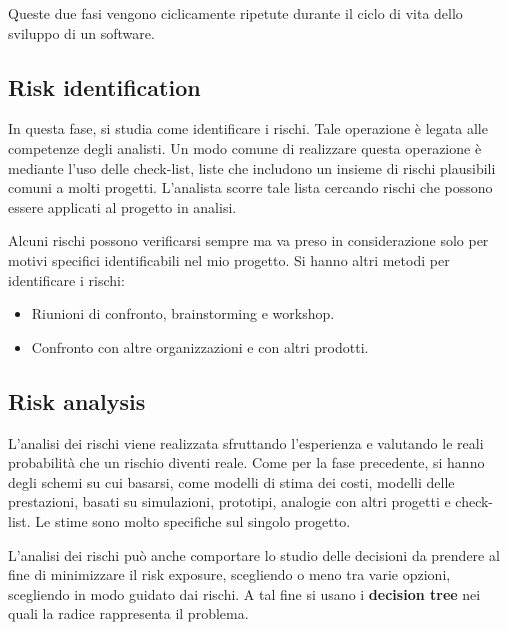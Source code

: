 Queste due fasi vengono ciclicamente ripetute durante il ciclo di vita dello
sviluppo di un software.
\subsection{Risk identification}
In questa fase, si studia come identificare i rischi. Tale operazione è legata
alle competenze degli analisti. Un modo comune di realizzare questa operazione è
mediante l'uso delle check-list, liste che includono un insieme di rischi plausibili
comuni a molti progetti. L'analista scorre tale lista cercando rischi che possono
essere applicati al progetto in analisi.

Alcuni rischi possono verificarsi sempre ma va preso in considerazione solo per
motivi specifici identificabili nel mio progetto. Si hanno altri metodi per
identificare i rischi:
\begin{itemize}
    \item Riunioni di confronto, brainstorming e workshop.
    \item Confronto con altre organizzazioni e con altri prodotti.
\end{itemize}
\subsection{Risk analysis}
L'analisi dei rischi viene realizzata sfruttando l'esperienza e valutando le
reali probabilità che un rischio diventi reale. Come per la fase precedente, si
hanno degli schemi su cui basarsi, come modelli di stima dei costi, modelli delle
prestazioni, basati su simulazioni, prototipi, analogie con altri progetti e
check-list. Le stime sono molto specifiche sul singolo progetto.

L'analisi dei rischi può anche comportare lo studio delle decisioni da prendere
al fine di minimizzare il risk exposure, scegliendo o meno tra varie opzioni,
scegliendo in modo guidato dai rischi. A tal fine si usano i \textbf{decision tree}
nei quali la radice rappresenta il problema.

